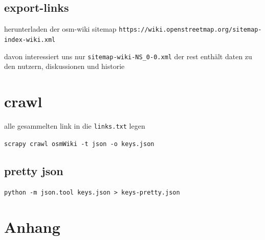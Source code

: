 \documentclass[12pt,pdftex,a4paper]{article}
\begin{document}
\subsection{export-links}
herunterladen der osm-wiki sitemap
\texttt{https://wiki.openstreetmap.org/sitemap-index-wiki.xml}


davon interessiert uns nur \texttt{sitemap-wiki-NS\_0-0.xml} der rest enthält daten zu den nutzern, diskussionen und historie

\section{crawl}
alle gesammelten link in die \texttt{links.txt} legen

\texttt{scrapy crawl osmWiki -t json -o keys.json}

\subsection{pretty json}
\texttt{python -m json.tool keys.json > keys-pretty.json}


\pagebreak
\section{Anhang}




\end{document}
